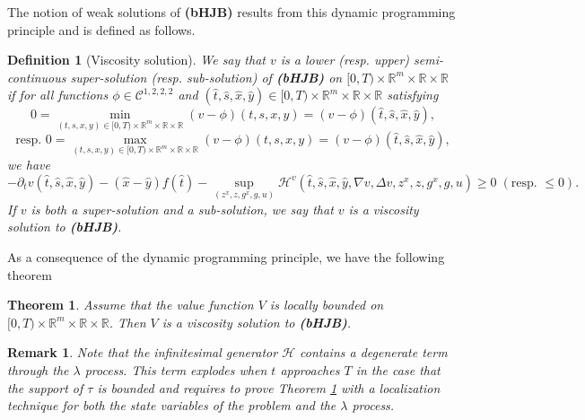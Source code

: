 \documentclass[11pt,a4paper]{article}
\theoremstyle{thmstyleone}%
\newtheorem{theorem}{Theorem}%
\theoremstyle{thmstyletwo}%
\newtheorem{remark}{Remark}%
\theoremstyle{thmstylethree}%
\newtheorem{definition}{Definition}%
\begin{document}
The notion of weak solutions of \textbf{(bHJB)} results from this dynamic programming principle and is defined as follows.

\begin{definition}[Viscosity solution]\label{viscosity:def} We say that $v$ is a lower (resp. upper) semi-continuous super-solution (resp. sub-solution) of \textbf{(bHJB)} on $[0,T)\times \mathbb R^m\times \mathbb R\times \mathbb R$ if for all functions $\phi\in \mathcal C^{1,2,2,2}$ and $(\hat t,\hat s,\hat x,\hat y)\in[0,T)\times \mathbb R^m\times \mathbb R\times \mathbb R$ satisfying 
\[0=\min_{(t,s,x,y)\in [0,T)\times \mathbb R^m\times \mathbb R\times \mathbb R} (v-\phi)(t,s,x,y)=(v-\phi)(\hat t,\hat s,\hat x,\hat y),\]
\[\text{resp. } 0=\max_{(t,s,x,y)\in [0,T)\times \mathbb R^m\times \mathbb R\times \mathbb R} (v-\phi)(t,s,x,y)=(v-\phi)(\hat t,\hat s,\hat x,\hat y),\]
    we have
    \[-\partial_t v(\hat t,\hat s,\hat x,\hat y) - (\hat x - \hat y) f(\hat t) -\sup_{(z^x, z, g^x, g, u)}    \mathcal H^v(\hat t,\hat s,\hat x,\hat y, \nabla v, \Delta v, z^x, z, g^x, g, u) \geq 0\; (\text{resp. }\leq 0).\]
    If $v$ is both a super-solution and a sub-solution, we say that $v$ is a viscosity solution to \textbf{(bHJB)}.
\end{definition}
As a consequence of the dynamic programming principle, we have the following theorem
\begin{theorem}\label{thm:visco}
    Assume that the value function $V$ is locally bounded on $[0,T)\times \mathbb R^m\times\mathbb R\times \mathbb R$. Then $V$ is a viscosity solution to \textbf{(bHJB)}.
\end{theorem}
\begin{remark}
    Note that the infinitesimal generator $\mathcal H$ contains a degenerate term through the $\lambda$ process. This term explodes when $t$ approaches $T$ in the case that the support of $\tau$ is bounded and requires to prove Theorem \ref{thm:visco} with a localization technique for both the state variables of the problem and the $\lambda$ process.
\end{remark}
\end{document}
